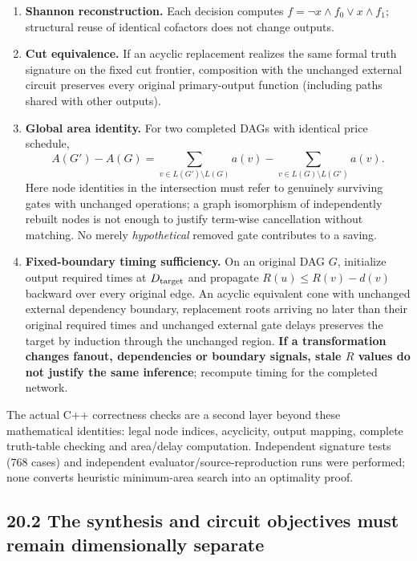 \documentclass[a4paper,10pt]{article}
\providecommand{\tightlist}{\setlength{\itemsep}{0pt}\setlength{\parskip}{0pt}}
\theoremstyle{definition}
\theoremstyle{remark}
\begin{document}
\begin{enumerate}
\def\labelenumi{\arabic{enumi}.}
\tightlist
\item
  \textbf{Shannon reconstruction.} Each decision computes \(f=\neg x\land f_0\lor x\land f_1\); structural reuse of identical cofactors does not change outputs.
\item
  \textbf{Cut equivalence.} If an acyclic replacement realizes the same formal truth signature on the fixed cut frontier, composition with the unchanged external circuit preserves every original primary-output function (including paths shared with other outputs).
\item
  \textbf{Global area identity.} For two completed DAGs with identical price schedule, \[
  A(G')-A(G)=\sum_{v\in L(G')\setminus L(G)}a(v)
      -\sum_{v\in L(G)\setminus L(G')}a(v).
  \] Here node identities in the intersection must refer to genuinely surviving gates with unchanged operations; a graph isomorphism of independently rebuilt nodes is not enough to justify term-wise cancellation without matching. No merely \emph{hypothetical} removed gate contributes to a saving.
\item
  \textbf{Fixed-boundary timing sufficiency.} On an original DAG \(G\), initialize output required times at \(D_{\rm target}\) and propagate \(R(u)\le R(v)-d(v)\) backward over every original edge. An acyclic equivalent cone with unchanged external dependency boundary, replacement roots arriving no later than their original required times and unchanged external gate delays preserves the target by induction through the unchanged region. \textbf{If a transformation changes fanout, dependencies or boundary signals, stale \(R\) values do not justify the same inference}; recompute timing for the completed network.
\end{enumerate}

The actual C++ correctness checks are a second layer beyond these mathematical identities: legal node indices, acyclicity, output mapping, complete truth-table checking and area/delay computation. Independent signature tests (768 cases) and independent evaluator/source-reproduction runs were performed; none converts heuristic minimum-area search into an optimality proof.

\subsection{20.2 The synthesis and circuit objectives must remain dimensionally separate}\label{the-synthesis-and-circuit-objectives-must-remain-dimensionally-separate}
\end{document}

